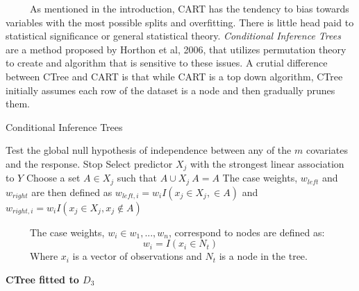 \documentclass[12pt,twoside]{reedthesis}
\begin{document}
  ~~~~~As mentioned in the introduction, CART has the tendency to bias
  towards variables with the most possible splits and overfitting. There
  is little head paid to statistical significance or general statistical
  theory. \emph{Conditional Inference Trees} are a method proposed by
  Horthon et al, 2006, that utilizes permutation theory to create and
  algorithm that is sensitive to these issues. A crutial difference
  between CTree and CART is that while CART is a top down algorithm, CTree
  initially assumes each row of the dataset is a node and then gradually
  prunes them.
  
  \begin{algorithm}
  \caption{Conditional Inference Trees}
  \label{ctree}
  \begin{algorithmic}[1]
  \State Test the global null hypothesis of independence between any of the $m$ covariates and the response. 
  \State Stop 
  \Else \State Select predictor $X_j$ with the strongest linear association to $Y$ 
  \EndIf
  \State Choose a set $A \in X_j$ such that $A \cup X_j \ A = A$ 
  \State The case weights, $w_{left}$ and $w_{right}$ are then defined as $w_{left,i} = w_i I (x_j \in X_j, \in A)$ and $w_{right,i} = w_i I(x_j \in X_j, x_j \notin A)$
  \EndFor
  \end{algorithmic}
  \end{algorithm}
  
  ~~~~~The case weights, \(w_i \in {w_1,..., w_n}\), correspond to nodes
  are defined as:\[w_i = I(x_i \in {N_t})\] ~~~~~Where \(x_i\) is a vector
  of observations and \(N_t\) is a node in the tree.
  
  \textbf{CTree fitted to \(D_3\)}
  
\end{document}
